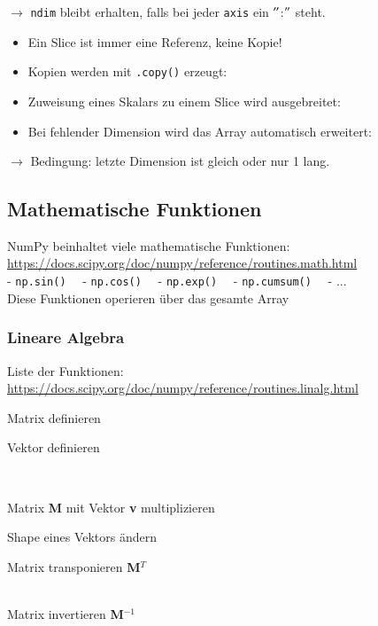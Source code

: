 $\rightarrow$ \texttt{ndim} bleibt erhalten, falls bei jeder \texttt{axis} ein $"$:$"$ steht.
\begin{itemize}
	\item Ein Slice ist immer eine Referenz, keine Kopie!
	
	\item Kopien werden mit \texttt{.copy()} erzeugt:
	
	\item Zuweisung eines Skalars zu einem Slice wird ausgebreitet:
	
	\item Bei fehlender Dimension wird das Array automatisch erweitert:
	
\end{itemize}
$\rightarrow$ Bedingung: letzte Dimension ist gleich oder nur 1 lang.

\pagebreak
\subsection{Mathematische Funktionen}
NumPy beinhaltet viele mathematische Funktionen:\\
\url{https://docs.scipy.org/doc/numpy/reference/routines.math.html}\\
- \texttt{np.sin()}
$\quad$- \texttt{np.cos()}
$\quad$- \texttt{np.exp()}
$\quad$- \texttt{np.cumsum()}
$\quad$- ...\\
Diese Funktionen operieren über das gesamte Array


\subsubsection{Lineare Algebra}
Liste der Funktionen:\\
\url{https://docs.scipy.org/doc/numpy/reference/routines.linalg.html}\\[12pt]
\begin{minipage}[t]{0.49\textwidth}
	Matrix definieren
	
\end{minipage}
\hspace{0.02\textwidth}
\begin{minipage}[t]{0.49\textwidth}
	Vektor definieren
	
\end{minipage}\\[12pt]
	
\begin{minipage}[t]{0.49\textwidth}
	Matrix \textbf{M} mit Vektor \textbf{v} multiplizieren
	
	Shape eines Vektors ändern
	
\end{minipage}
\hspace{0.02\textwidth}
\begin{minipage}[t]{0.49\textwidth}
	Matrix transponieren \textbf{M$^T$}
	
	$\quad$\\[12pt]
	Matrix invertieren \textbf{M$^{-1}$}
	
\end{minipage}
